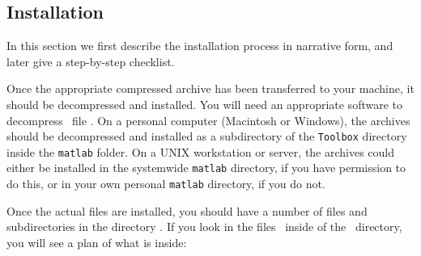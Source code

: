 \documentclass{article}
\begin{document}
\subsection{Installation}

In this section we first describe the installation process in narrative form,
and later give a step-by-step checklist.

Once the appropriate compressed archive has been transferred to your
machine, it should be decompressed and installed. You will need an
appropriate software to decompress \dotzip\ file \WLName \dotzip. On
a personal computer (Macintosh or Windows), the archives should be
decompressed and installed as a subdirectory of the {\tt Toolbox}
directory inside the {\tt matlab} folder. On a UNIX workstation or
server, the archives could either be installed in the systemwide
{\tt matlab} directory, if you have permission to do this, or in
your own personal {\tt matlab} directory, if you do not.

Once the actual files are installed, you should have a number of files and
subdirectories in the directory \WLDir. If you look in the files
\Contents\ inside of the \WLDir\ directory, you will see a plan of what is inside:
\end{document}
